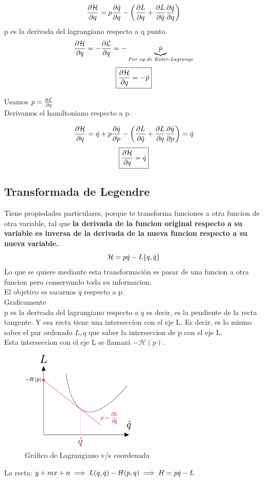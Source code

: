 \documentclass[12pt]{article}
\newcommand{\eq}[1]{\[#1\]}
\newcommand{\en}[1]{\[\boxed{#1}\]}
\renewcommand{\ss}[1]{\subsection{#1}}
\begin{document}
$$\pdv{\mathcal{H}}{q}= p \pdv{\dot{q}}{q} - \qty(\pdv{L}{q}+ \pdv{L}{\dot{q}} \pdv{\dot{q}}{q})$$
p es la derivada del lagrangiano respecto a q punto.\\
\eq{\pdv{\mathcal{H}}{q} =-\pdv{\mathcal{L}}{q}=- \underbrace{\dot{p}}_{\textit{Por eq.de Euler-Lagrange}}}
\en{\pdv{\mathcal{H}}{q} = - \dot{p}}

Usamos $p= \pdv{\mathcal{L}}{q} $\\
Derivamos el hamiltoniano respecto a p.

$$\pdv{\mathcal{H}}{q}= \dot{q} +p \pdv{\dot{q}}{p} - \qty(\pdv{L}{\dot{q}}+ \pdv{L}{q} \pdv{\dot{q}}{p})= \dot{q}$$
\en{\pdv{\mathcal{H}}{q}=\dot{q}}
\ss{Transformada de Legendre}
Tiene propiedades particulares, porque te transforma funciones a otra funcion de otra variable, tal que \textbf{la derivada de la funcion original respecto a su variable es inversa de la derivada de la nueva funcion respecto a su nueva variable.}.\\
$$\mathcal{H}= p \dot{q} - L\qty{q,\dot{q}}$$
Lo que se quiere mediante esta transformación es pasar de una funcion a otra funcion pero conservando toda su informacion. \\
El objetivo es sacarnos $\dot{q}$ respecto a p. \\
Graficamente \\
p es la derivada del lagrangiano respecto a $\dot{q}$ es decir, es la pendiente de la recta tangente. Y esa recta tiene una interseccion con el eje L. Es decir, es lo mismo saber el par ordenado $L,\dot{q}$ que saber la interseccion de p con el eje L.\\
Esta interseccion con el eje L se llamará $-\mathcal{H}(p)$.\\


\begin{figure}[h!]
    \centering
    \includegraphics[width=0.5\textwidth]{grafico_lq.png}
    \caption{Gráfico de Lagrangiano v/s coordenada}
    \label{grafico_lq}
\end{figure}
La recta:$y+mx +n \implies L \qty(q,\dot{q}) - H(p,q) \implies H= p \dot{q}-L$
\end{document}
